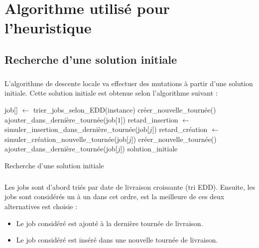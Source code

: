 \chapter{Algorithme utilisé pour l'heuristique}


\section{Recherche d'une solution initiale}

\paragraph{}
L'algorithme de descente locale va effectuer des mutations à partir d'une solution initiale.
Cette solution initiale est obtenue selon l'algorithme suivant :

\begin{algorithm}[H] %
\begin{algorithmic}
\STATE {}
\STATE job[] $ \leftarrow $ trier\_jobs\_selon\_EDD(instance)
\STATE {}
\STATE créer\_nouvelle\_tournée()
\STATE ajouter\_dans\_dernière\_tournée(job[$ 1 $])
\STATE {}
\STATE retard\_insertion $ \leftarrow $ simuler\_insertion\_dans\_dernière\_tournée(job[$ j $])
\STATE retard\_création $ \leftarrow $ simuler\_création\_nouvelle\_tournée(job[$ j $])
\STATE créer\_nouvelle\_tournée()
\ENDIF
\STATE ajouter\_dans\_dernière\_tournée(job[$ j $])
\ENDFOR
\RETURN solution\_initiale
\end{algorithmic}
\caption{\label{alg:solution-initiale}Recherche d'une solution initiale}
\end{algorithm}

\paragraph{}
Les jobs sont d'abord triés par date de livraison croissante (tri EDD).
Ensuite, les jobs sont considérés un à un dans cet ordre, est la meilleure de ces deux alternatives est choisie :
\begin{itemize}
\item Le job considéré est ajouté à la dernière tournée de livraison.
\item Le job considéré est inséré dans une nouvelle tournée de livraison.
\end{itemize}
